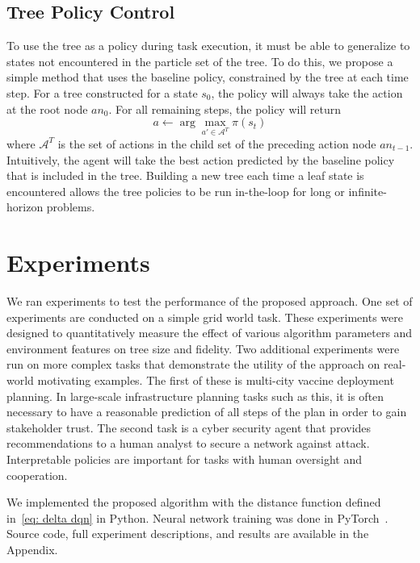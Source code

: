 \documentclass[letterpaper]{article} %
\begin{document}
\subsection{Tree Policy Control}\label{sec: tree execution}
To use the tree as a policy during task execution, it must be able to generalize to states not encountered in the particle set of the tree.
To do this, we propose a simple method that uses the baseline policy, constrained by the tree at each time step.
For a tree constructed for a state $s_0$, the policy will always take the action at the root node $an_0$.
For all remaining steps, the policy will return
\begin{equation}
    a \gets \arg\max_{a' \in \mathcal{A}^T} \pi(s_t)
\end{equation}
where $\mathcal{A}^T$ is the set of actions in the child set of the preceding action node $an_{t-1}$.
Intuitively, the agent will take the best action predicted by the baseline policy that is included in the tree.
Building a new tree each time a leaf state is encountered allows the tree policies to be run in-the-loop for long or infinite-horizon problems.

\section{Experiments}
We ran experiments to test the performance of the proposed approach.
One set of experiments are conducted on a simple grid world task.
These experiments were designed to quantitatively measure the effect of various algorithm parameters and environment features on tree size and fidelity.
Two additional experiments were run on more complex tasks that demonstrate the utility of the approach on real-world motivating examples.
The first of these is multi-city vaccine deployment planning.
In large-scale infrastructure planning tasks such as this, it is often necessary to have a reasonable prediction of all steps of the plan in order to gain stakeholder trust.
The second task is a cyber security agent that provides recommendations to a human analyst to secure a network against attack.
Interpretable policies are important for tasks with human oversight and cooperation.

We implemented the proposed algorithm with the distance function defined in~\cref{eq: delta dqn} in Python. %
Neural network training was done in PyTorch~\cite{paszke2015}.
Source code, full experiment descriptions, and results are available in the Appendix.
\end{document}
